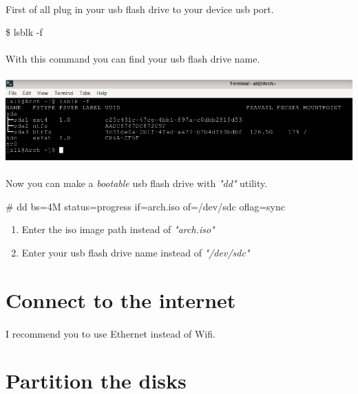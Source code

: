 \documentclass[12pt, a4paper]{article}
\begin{document}
\paragraph{}
First of all plug in your usb flash drive to your device usb port.

\begin{center}
	\$ lsblk -f
\end{center}

 \paragraph{}
With this command you can find your usb flash drive name.\\\\
\includegraphics[scale=0.5]{lsblk.png}

\paragraph{}
Now you can make a \emph{bootable} usb flash drive with \emph{"dd"} utility.

\begin{center}
	\# dd bs=4M status=progress if=arch.iso  of=/dev/sdc oflag=sync
\end{center}

\begin{enumerate}
	\item Enter the iso image path instead of \emph{"arch.iso"}
	\item Enter your usb flash drive name instead of \emph{"/dev/sdc"}
\end{enumerate}

\section{Connect to the internet}
\paragraph{}
I recommend you to use Ethernet instead of Wifi.

\section{Partition the disks}
\end{document}
